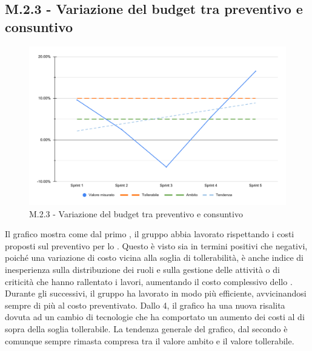 \subsection{M.2.3 - Variazione del budget tra preventivo e consuntivo}
\begin{figure}[H]
    \centering
    \includegraphics[width=\textwidth]{assets/variazione_budget.pdf}
    \caption{M.2.3 - Variazione del budget tra preventivo e consuntivo}
\end{figure}

\par Il grafico mostra come dal primo , il gruppo abbia lavorato rispettando i costi proposti sul preventivo per lo . Questo è visto sia in termini positivi che negativi, poiché una variazione di costo vicina alla soglia di tollerabilità, è anche indice di inesperienza sulla distribuzione dei ruoli e sulla gestione delle attività o di criticità che hanno rallentato i lavori, aumentando il costo complessivo dello .
Durante gli  successivi, il gruppo ha lavorato in modo più efficiente, avvicinandosi sempre di più al costo preventivato. Dallo  4, il grafico ha una nuova risalita dovuta ad un cambio di tecnologie che ha comportato un aumento dei costi al di sopra della soglia tollerabile. La tendenza generale del grafico, dal secondo  è comunque sempre rimasta compresa tra il valore ambito e il valore tollerabile. 